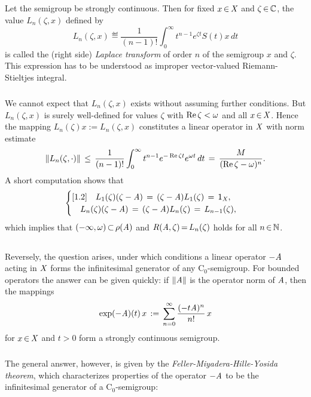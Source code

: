 \documentclass[11pt,twoside]{article}
\begin{document}
\subparagraph{}
Let the semigroup {\SG} be strongly continuous.
Then for fixed $x {\,\in\,} \mathit{X}$ and $\zeta {\,\in\,} {\mathbb{C}}$,
the value $L_n(\zeta,x)$ defined by
\begin{equation}\label{LAPLACE}
L_n(\zeta,x) \eqdef
\frac{1}{(n-1)!} \int_{\,0}^{\infty} t^{n-1}e^{\zeta t}S(t)x \,dt
\end{equation}
is called the (right side) \textit{Laplace transform} of order $n$
of the semigroup {\wrt} $x$ and $\zeta$.
This expression has to be understood as
improper vector-valued Riemann-Stieltjes integral.

\subparagraph{}
We cannot expect that $L_n(\zeta,x)$ exists without assuming further conditions.
But $L_n(\zeta,x)$ is surely well-defined for
values $\zeta$ with $\operatorname{Re} \zeta < \omega$ and all $x {\,\in\,} \mathit{X}$.
Hence the mapping $L_n(\zeta)x := L_n(\zeta,x)$ constitutes a linear operator
in $\mathit{X}$ with norm estimate
\[
\left\lVert L_n(\zeta,\cdot) \right\rVert
\, \leq \,
\frac{1}{(n-1)!} \int_0^{\infty} t^{n-1} e^{-\operatorname{Re} \zeta t}e^{\omega t}\,dt
\,=\, \frac{M}{(\operatorname{Re} \zeta - \omega)^n}.
\]
A short computation shows that
\[
\begin{cases}[1.2]
\quad L_1(\zeta)(\zeta-\mathit{A}) \,=\, (\zeta-\mathit{A})L_1(\zeta) \,=\, {\mathsf{1}}_{\mathit{X}},     \\
\quad L_n(\zeta)(\zeta-\mathit{A}) \,=\, (\zeta-\mathit{A})L_n(\zeta) \,=\, L_{n-1}(\zeta), \\
\end{cases}
\]
which implies that $(-\infty,\omega) {\,\subset\,} \rho(\mathit{A})$
and $R(\mathit{A},\zeta) {\,=\,} L_n(\zeta)$ holds for all $n {\,\in\,} {\mathbb{N}}$.

\subsection{} %
Reversely,
the question arises,
under which conditions a linear operator ${-}\mathit{A}$ acting in $\mathit{X}$ forms
the infinitesimal generator of any C$_0$-semigroup.
For bounded operators the answer can be given quickly:
if $\left\lVert \mathit{A} \right\rVert$ is the operator norm of $\mathit{A}$,
then the mappings
\[
\exp({-}\mathit{A})(t)\,x \,:=\, \sum_{n=0}^{\infty} \frac{(-t \mathit{A})^n}{n!} \,x
\]
for $x {\,\in\,} \mathit{X}$ and $t>0$ form a strongly continuous semigroup.

\subparagraph{} %
The general answer,
however,
is given by the \textit{Feller-Miyadera-Hille-Yosida} \textit{theorem},
which characterizes properties of the operator ${-}\mathit{A}$
to be the infinitesimal generator of a C$_0$-semigroup: 
\end{document}

